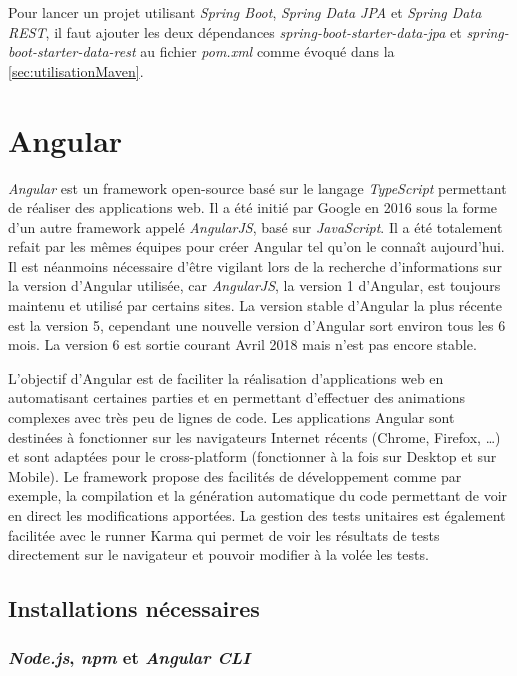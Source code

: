 \documentclass{polytech/polytech}
\begin{document}
Pour lancer un projet utilisant \textit{Spring Boot}, \textit{Spring Data JPA} et \textit{Spring Data REST}, il faut ajouter les deux dépendances \textit{spring-boot-starter-data-jpa} et \textit{spring-boot-starter-data-rest} au fichier \textit{pom.xml} comme évoqué dans la \autoref{sec:utilisationMaven}.


\chapter{Angular}
\label{chap:angular}

\textit{Angular} est un framework open-source basé sur le langage \textit{TypeScript} permettant de réaliser des applications web. Il a été initié par Google en 2016 sous la forme d’un autre framework appelé \textit{AngularJS}, basé sur \textit{JavaScript}. Il a été totalement refait par les mêmes équipes pour créer Angular tel qu’on le connaît aujourd'hui. Il est néanmoins nécessaire d’être vigilant lors de la recherche d’informations sur la version d’Angular utilisée, car \textit{AngularJS}, la version 1 d’Angular, est toujours maintenu et utilisé par certains sites. La version stable d’Angular la plus récente est la version 5, cependant une nouvelle version d’Angular sort environ tous les 6 mois. La version 6 est sortie courant Avril 2018 mais n’est pas encore stable.

L’objectif d’Angular est de faciliter la réalisation d’applications web en automatisant certaines parties et en permettant d’effectuer des animations complexes avec très peu de lignes de code. Les applications Angular sont destinées à fonctionner sur les navigateurs Internet récents (Chrome, Firefox, …) et sont adaptées pour le cross-platform (fonctionner à la fois sur Desktop et sur Mobile). Le framework propose des facilités de développement comme par exemple, la compilation et la génération automatique du code permettant de voir en direct les modifications apportées. La gestion des tests unitaires est également facilitée avec le runner Karma qui permet de voir les résultats de tests directement sur le navigateur et pouvoir modifier à la volée les tests.

\section{Installations nécessaires}

\subsection{\textit{Node.js}, \textit{npm} et \textit{Angular CLI}}
\end{document}
